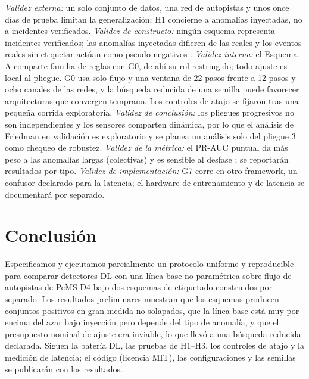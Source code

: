 \documentclass[conference]{IEEEtran}
\begin{document}
\emph{Validez externa:} un solo conjunto de datos, una red de autopistas y unos
once d\'ias de prueba limitan la generalizaci\'on; H1 concierne a anomal\'ias
inyectadas, no a incidentes verificados. \emph{Validez de constructo:} ning\'un esquema representa incidentes
verificados; las anomal\'ias inyectadas difieren de las reales
\cite{carmona2022ncad} y los eventos reales sin etiquetar act\'uan como
pseudo-negativos \cite{goswami2023unsupervised}. \emph{Validez interna:} el
Esquema A comparte familia de reglas con G0, de ah\'i su rol restringido; todo
ajuste es local al pliegue. G0 usa solo flujo y una ventana de 22 pasos frente
a 12 pasos y ocho canales de las redes, y la b\'usqueda reducida de una semilla
puede favorecer arquitecturas que convergen temprano. Los controles de atajo
se fijaron tras una peque\~na corrida exploratoria. \emph{Validez de
conclusi\'on:} los pliegues progresivos no son independientes y los sensores
comparten din\'amica, por lo que el an\'alisis de Friedman en validaci\'on es
exploratorio y se planea un an\'alisis solo del pliegue 3 como chequeo de
robustez. \emph{Validez de la m\'etrica:} el PR-AUC puntual da m\'as peso a las
anomal\'ias largas (colectivas) y es sensible al desfase
\cite{sorbo2024navigating,liu2024elephant}; se reportar\'an resultados por
tipo. \emph{Validez de implementaci\'on:} G7 corre en otro framework, un
confusor declarado para la latencia; el hardware de entrenamiento y de latencia
se documentar\'a por separado.

\section{Conclusi\'on}

Especificamos y ejecutamos parcialmente un protocolo uniforme y reproducible
para comparar detectores DL con una l\'inea base no param\'etrica sobre flujo de
autopistas de PeMS-D4 bajo dos esquemas de etiquetado construidos por
separado. Los resultados preliminares muestran que los esquemas producen
conjuntos positivos en gran medida no solapados, que la l\'inea base est\'a muy
por encima del azar bajo inyecci\'on pero depende del tipo de anomal\'ia, y que
el presupuesto nominal de ajuste era inviable, lo que llev\'o a una b\'usqueda
reducida declarada. Siguen la bater\'ia DL, las pruebas de H1--H3, los
controles de atajo y la medici\'on de latencia; el c\'odigo (licencia MIT), las
configuraciones y las semillas se publicar\'an con los resultados.



\end{document}
